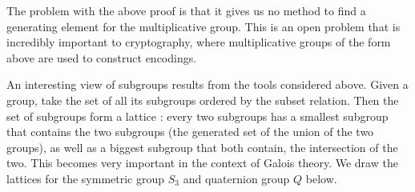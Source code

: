 \documentclass[12pt]{amsbook}
\theoremstyle{definition}
\newcommand{\gen}[1]{\langle #1 \rangle} %
\begin{document}
The problem with the above proof is that it gives us no method to find a generating element for the multiplicative group. This is an open problem that is incredibly important to cryptography, where multiplicative groups of the form above are used to construct encodings.

An interesting view of subgroups results from the tools considered above. Given a group, take the set of all its subgroups ordered by the subset relation. Then the set of subgroups form a lattice : every two subgroups has a smallest subgroup that contains the two subgroups (the generated set of the union of the two groups), as well as a biggest subgroup that both contain, the intersection of the two. This becomes very important in the context of Galois theory. We draw the lattices for the symmetric group $S_3$ and quaternion group $Q$ below.

\begin{center}
\end{center}
\end{document}
